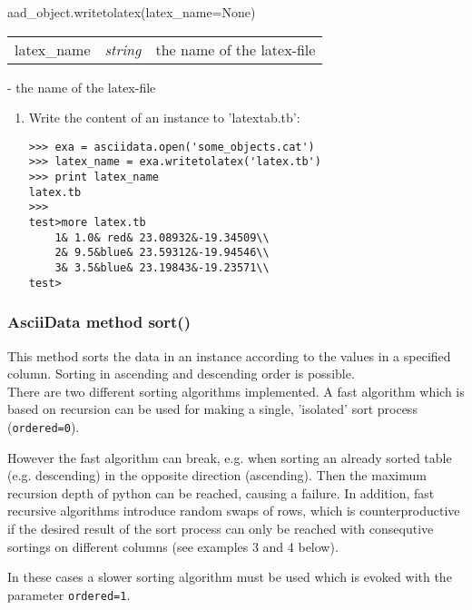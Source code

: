 aad\_object.writetolatex(latex\_name=None)


\begin{tabular}{lcl}
latex\_name & {\it string} & the name of the latex-file\\
\end{tabular}

- the name of the latex-file

\begin{enumerate}
\item Write the content of an \ad instance to 'latextab.tb':
\begin{small}
\begin{verbatim}
>>> exa = asciidata.open('some_objects.cat')
>>> latex_name = exa.writetolatex('latex.tb')
>>> print latex_name
latex.tb
>>>
test>more latex.tb
    1& 1.0& red& 23.08932&-19.34509\\
    2& 9.5&blue& 23.59312&-19.94546\\
    3& 3.5&blue& 23.19843&-19.23571\\
test>
\end{verbatim}
\end{small}
\end{enumerate}


\subsubsection{AsciiData method sort()}
\label{adm_sort}
%
This method sorts the data in an \ad instance according to the values
in a specified column. Sorting in ascending and descending order is
possible.\\
There are two different sorting algorithms implemented. A fast algorithm
which is based on recursion can be used for making a single, 'isolated' sort
process ({\tt ordered=0}).

However the fast algorithm can break, e.g. when sorting an already sorted table
(e.g. descending) in the opposite direction (ascending). Then the maximum
recursion depth of python can be reached, causing a failure.
In addition, fast recursive algorithms introduce random swaps of rows, which
is counterproductive if the desired result of the sort process can only
be reached with consequtive sortings on different columns (see
examples 3 and 4 below).

In these cases a slower sorting algorithm must be used which is evoked
with the parameter {\tt ordered=1}.

